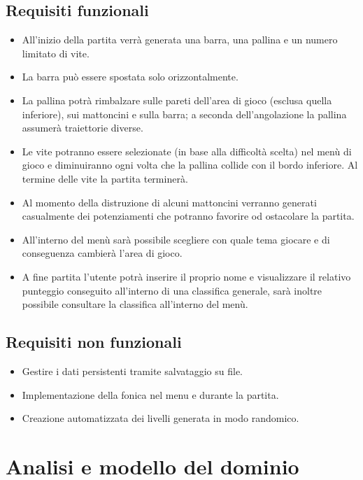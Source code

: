 \documentclass[a4paper,12pt]{report}
\begin{document}
    \subsection*{Requisiti funzionali}
        \begin{itemize}
            \item All'inizio della partita verrà generata una barra, una pallina e un numero limitato di vite. 
            \item La barra può essere spostata solo orizzontalmente. 
            \item La pallina potrà rimbalzare sulle pareti dell'area di gioco (esclusa quella inferiore), sui mattoncini e sulla barra; a seconda dell'angolazione la pallina assumerà traiettorie diverse.
            \item Le vite potranno essere selezionate (in base alla difficoltà scelta) nel menù di gioco e diminuiranno ogni volta che la pallina collide con il bordo inferiore. Al termine delle vite la partita terminerà.
            \item Al momento della distruzione di alcuni mattoncini verranno generati casualmente dei potenziamenti che potranno favorire od ostacolare la partita.
            \item All'interno del menù sarà possibile scegliere con quale tema giocare e di conseguenza cambierà l'area di gioco.
            \item A fine partita l'utente potrà inserire il proprio nome e visualizzare
            il relativo punteggio conseguito all'interno di una classifica generale, sarà inoltre possibile consultare la classifica all'interno del menù.
        \end{itemize}
    
    \subsection*{Requisiti non funzionali}
        \begin{itemize}
            \item Gestire i dati persistenti tramite salvataggio su file.
            \item Implementazione della fonica nel menu e durante la partita.
            \item Creazione automatizzata dei livelli generata in modo randomico.
        \end{itemize}
    
\section{Analisi e modello del dominio}
\end{document}
